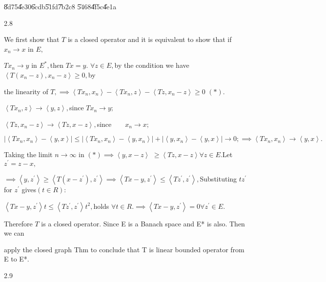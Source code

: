 \documentclass{article}
\begin{document}
\bigskip \U{8d75}\U{4e30}\qquad \U{6cdb}\U{51fd}\U{7b2c}8%
\U{5468}\U{4f5c}\U{4e1a}

2.8

We first show that $T$ is a closed operator and it is equivalent to show
that if $x_{n}\rightarrow x$ in $E,$

$Tx_{n}\rightarrow y$ in $E^{\ast },$then $Tx=y.$ $\forall z\in E,$by the
condition we have $\left\langle T(x_{n}-z),x_{n}-z\right\rangle \geq 0,$by

the linearity of $T,\implies \left\langle Tx_{n},x_{n}\right\rangle
-\left\langle Tx_{n},z\right\rangle -\left\langle Tz,x_{n}-z\right\rangle
\geq 0$ $\left( \ast \right) .$

$\left\langle Tx_{n},z\right\rangle \rightarrow \left\langle
y,z\right\rangle ,$since $Tx_{n}\rightarrow y;$

$\left\langle Tz,x_{n}-z\right\rangle \rightarrow \left\langle
Tz,x-z\right\rangle ,$since$\qquad x_{n}\rightarrow x;$

$\left\vert \left\langle Tx_{n},x_{n}\right\rangle -\left\langle
y,x\right\rangle \right\vert \leq \left\vert \left\langle
Tx_{n},x_{n}\right\rangle -\left\langle y,x_{n}\right\rangle \right\vert
+\left\vert \left\langle y,x_{n}\right\rangle -\left\langle y,x\right\rangle
\right\vert \rightarrow 0;\implies \left\langle Tx_{n},x_{n}\right\rangle
\rightarrow \left\langle y,x\right\rangle .$

Taking the limit $n\rightarrow \infty $ in $\left( \ast \right) \implies
\left\langle y,x-z\right\rangle $ $\geq \left\langle Tz,x-z\right\rangle
\forall z\in E.$Let $z^{\prime }=z-x,$

$\implies \left\langle y,z^{\prime }\right\rangle \geq \left\langle T\left(
x-z^{\prime }\right) ,z^{\prime }\right\rangle \implies \left\langle
Tx-y,z^{\prime }\right\rangle \leq \left\langle Tz^{\prime },z^{\prime
}\right\rangle ,$Substituting $tz^{\prime }$ for $z^{\prime }$ gives$\left(
t\in R\right) $:

$\left\langle Tx-y,z^{\prime }\right\rangle t\leq \left\langle Tz^{\prime
},z^{\prime }\right\rangle t^{2},$holds $\forall t\in R.\implies
\left\langle Tx-y,z^{\prime }\right\rangle =0\forall z^{\prime }\in E.$

Therefore $T$ is a closed operator. Since E is a Banach space and E* is
also. Then we can

apply the closed graph Thm to conclude that T is linear bounded operator
from E to E*.

2.9
\end{document}
